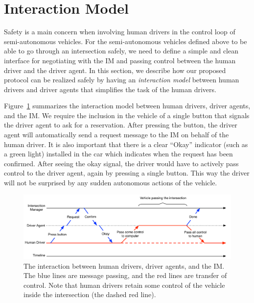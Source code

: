 \section{Interaction Model}
\label{sec:interface}



Safety is a main concern when involving human drivers in the control
loop of semi-autonomous vehicles.  For the semi-autonomous vehicles
defined above to be able to go through an intersection safely, we need
to define a simple and clean interface for negotiating with the IM and
passing control between the human driver and the driver agent.  In
this section, we describe how our proposed protocol can be realized
safely by having an \emph{interaction model} between human drivers and
driver agents that simplifies the task of the human drivers.

Figure~\ref{fig:interaction} summarizes the interaction model between
human drivers, driver agents, and the IM.  We require the inclusion in
the vehicle of a single button that signals the driver agent to ask
for a reservation. After pressing the button, the driver agent will
automatically send a request message to the IM on behalf of the human
driver. It is also important that there is a clear ``Okay'' indicator
(such as a green light) installed in the car which indicates when the
request has been confirmed.  After seeing the okay signal, the driver
would have to actively pass control to the driver agent, again by
pressing a single button.  This way the driver will not be surprised
by any sudden autonomous actions of the vehicle.

\begin{figure}[t]
\centering
\includegraphics[width=\columnwidth]{figures/interaction}
\caption{The interaction between human drivers, driver agents, and the
IM.  The blue lines are message passing, and the red lines are
transfer of control.  Note that human drivers retain some control of the vehicle
inside the intersection (the dashed red line).}
\label{fig:interaction}
\end{figure}


